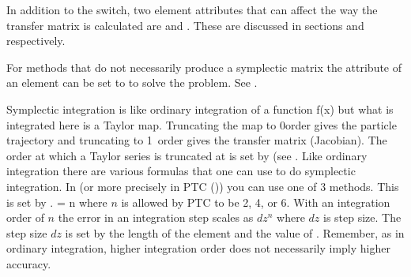 In addition to the  switch, two element attributes that can affect the way the
transfer matrix is calculated are  and . These are
discussed in sections  and  respectively.

For methods that do not necessarily produce a symplectic matrix the  attribute of an
element can be set to  to solve the problem. See .

Symplectic integration is like ordinary integration of a function f(x) but what is integrated here
is a Taylor map. Truncating the map to 0\Th order gives the particle trajectory and truncating to
1\St\ order gives the transfer matrix (Jacobian).  The order at which a Taylor series is truncated
at is set by  (see . Like ordinary integration there are various
formulas that one can use to do symplectic integration. In \bmad (or more precisely in PTC
()) you can use one of 3 methods. This is set by .
 = n where $n$ is allowed by PTC to be 2, 4, or 6. With an integration order of
$n$ the error in an integration step scales as $dz^n$ where $dz$ is step size. The step size $dz$ is
set by the length of the element and the value of . Remember, as in ordinary
integration, higher integration order does not necessarily imply higher accuracy.

